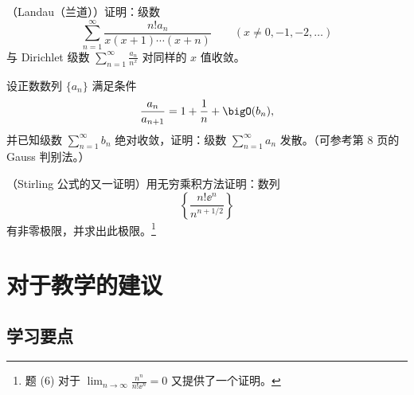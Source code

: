 \begin{xexercise}[8]
（Landau（兰道））证明：级数
\[
\sum_{n=1}^{\infty}\frac{n!a_n}{x(x+1)\cdots(x+n)}\qquad(x\neq0,-1,-2,\ldots)
\]
与 Dirichlet 级数 $\sum_{n=1}^{\infty}\frac{a_n}{n^x}$ 对同样的 $x$ 值收敛。
\end{xexercise}

\begin{xexercise}[9]
设正数数列 $\{a_n\}$ 满足条件
\[
\frac{a_n}{a_{n+1}}=1+\frac1n+\bigO(b_n),
\]
并已知级数 $\sum_{n=1}^{\infty}b_n$ 绝对收敛，证明：级数 $\sum_{n=1}^{\infty}a_n$ 发散。（可参考第 8 页的 Gauss 判别法。）
\end{xexercise}

\begin{xexercise}[10]
（Stirling 公式的又一证明）用无穷乘积方法证明：数列
\[
\left\{\frac{n!\ee^n}{n^{n+1/2}}\right\}
\]
有非零极限，并求出此极限。\footnote{题 (6) 对于 $\lim_{n\to\infty}\frac{n^n}{n!\ee^n}=0$ 又提供了一个证明。}
\end{xexercise}

\section{对于教学的建议}

\subsection{学习要点}

